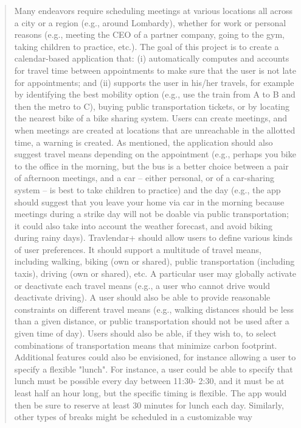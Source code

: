 \setcounter{page}{2}

\newpage
\begin{verse}
	Many endeavors require scheduling meetings at various locations all across a city or a region (e.g., around Lombardy), whether for work or personal reasons (e.g., meeting the CEO of a partner company, going to the gym, taking children to practice, etc.). The goal of this project is to create a calendar-based application that: (i) automatically computes and accounts for travel time between appointments to make sure that the user is not late for appointments; and (ii) supports the user in his/her travels, for example by identifying the best mobility option (e.g., use the train from A to B and then the metro to C), buying public transportation tickets, or by locating the nearest bike of a bike sharing system. Users can create meetings, and when meetings are created at locations that are unreachable in the allotted time, a warning is created. As mentioned, the application should also suggest travel means depending on the appointment (e.g., perhaps you bike to the office in the morning, but the bus is a better choice between a pair of afternoon meetings, and a car – either personal, or of a car-sharing system – is best to take children to practice) and the day (e.g., the app should suggest that you leave your home via car in the morning because meetings during a strike day will not be doable via public transportation; it could also take into account the weather forecast, and avoid biking during rainy days). Travlendar+ should allow users to define various kinds of user preferences. It should support a multitude of travel means, including walking, biking (own or shared), public transportation (including taxis), driving (own or shared), etc. A particular user may globally activate or deactivate each travel means (e.g., a user who cannot drive would deactivate driving). A user should also be able to provide reasonable constraints on different travel means (e.g., walking distances should be less than a given distance, or public transportation should not be used after a given time of day). Users should also be able, if they wish to, to select combinations of transportation means that minimize carbon footprint. Additional features could also be envisioned, for instance allowing a user to specify a flexible "lunch". For instance, a user could be able to specify that lunch must be possible every day between 11:30- 2:30, and it must be at least half an hour long, but the specific timing is flexible. The app would then be sure to reserve at least 30 minutes for lunch each day. Similarly, other types of breaks might be scheduled in a customizable way
\end{verse}
\newpage
{}
\tableofcontents
\newpage
{}
\listoffigures
{}
\listoftables

